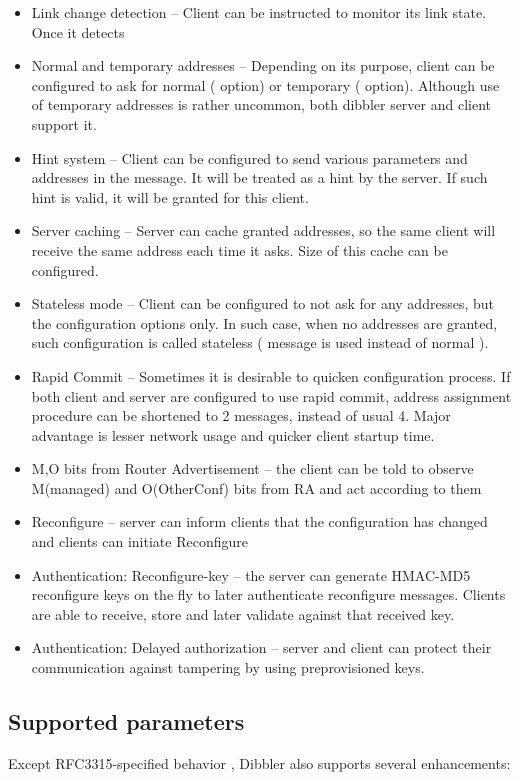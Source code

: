\begin{itemize}
\item Link change detection -- Client can be instructed to monitor its
      link state. Once it detects
\item Normal and temporary addresses -- Depending on its purpose,
      client can be configured to ask for normal ( option)
      or temporary ( option). Although use of temporary
      addresses is rather uncommon, both dibbler server and client
      support it.
\item Hint system -- Client can be configured to send various parameters
      and addresses in the  message. It will be treated as
      a hint by the server. If such hint is valid, it will be granted
      for this client.
\item Server caching -- Server can cache granted addresses, so the same
      client will receive the same address each time it asks. Size of
      this cache can be configured.
\item Stateless mode -- Client can be configured to not ask for any
      addresses, but the configuration options only. In such case, when
      no addresses are granted, such configuration is called stateless
      ( message is used instead of normal
      ).
\item Rapid Commit -- Sometimes it is desirable to quicken configuration
      process. If both client and server are configured to use rapid
      commit, address assignment procedure can be shortened to 2
      messages, instead of usual 4. Major advantage is lesser network
      usage and quicker client startup time.
\item M,O bits from Router Advertisement -- the client can be told to
  observe M(managed) and O(OtherConf) bits from RA and act according
  to them
\item Reconfigure -- server can inform clients that the configuration
  has changed and clients can initiate Reconfigure
\item Authentication: Reconfigure-key -- the server can generate HMAC-MD5
  reconfigure keys on the fly to later authenticate reconfigure
  messages. Clients are able to receive, store and later validate
  against that received key.
\item Authentication: Delayed authorization -- server and client can
  protect their communication against tampering by using
  preprovisioned keys.
\end{itemize}

\subsection{Supported parameters}
Except RFC3315-specified behavior \cite{rfc3315}, Dibbler also supports
several enhancements:

